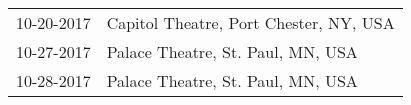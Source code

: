 \begin{supertabular}{ll}
 10-20-2017 &  Capitol Theatre, Port Chester, NY, USA \\
 10-27-2017 &       Palace Theatre, St. Paul, MN, USA \\
 10-28-2017 &       Palace Theatre, St. Paul, MN, USA \\
\end{supertabular}
